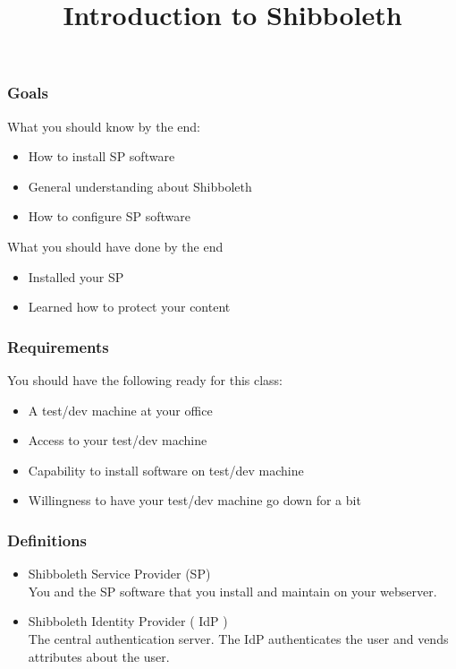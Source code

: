 


\title[Shibboleth Bootcamp]{Introduction to Shibboleth}



\begin{frame}
\frametitle{Goals}

What you should know by the end:
\begin{itemize}
\item How to install SP software
\item General understanding about Shibboleth
\item How to configure SP software
\end{itemize}

\bigskip

What you should have done by the end
\begin{itemize}
\item Installed your SP
\item Learned how to protect your content
\end{itemize}

\end{frame}

\begin{frame}
\frametitle{Requirements}

You should have the following ready for this class:
\begin{itemize}
\item A test/dev machine at your office
\item Access to your test/dev machine
\item Capability to install software on test/dev machine
\item Willingness to have your test/dev machine go down for a bit
\end{itemize}

\end{frame}

\begin{frame}
\frametitle{Definitions}
\begin{itemize} 
\item Shibboleth Service Provider (SP) \\ You and the SP software that you install and maintain on your webserver.
\item Shibboleth Identity Provider ( IdP ) \\ The central authentication server. The IdP authenticates the user and vends attributes about the user.
\end{itemize}
\end{frame}

